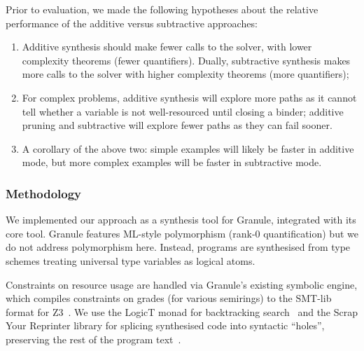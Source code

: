 \newcommand{\stderr}[1]{\textcolor{gray}{${#1}$}} %
\newcommand{\fail}{\textcolor{mypink3}{$\times$}}
\newcommand{\success}{\checkmark}
\newcommand{\highlight}[1]{%
{\setlength{\fboxsep}{0pt}\colorbox{yellow!50}{$\displaystyle#1$}}}

Prior to evaluation, we made the following hypotheses about the
relative performance of the additive versus subtractive approaches:
%
\begin{enumerate}[itemsep=0em]
\item Additive synthesis should make fewer calls to the solver, with lower
complexity theorems (fewer quantifiers). Dually,
subtractive synthesis makes more calls to the solver with
higher complexity theorems (more quantifiers);

\item For complex problems, additive synthesis will
explore more paths as it cannot tell whether a variable is not
well-resourced until closing a binder; additive pruning and subtractive will
explore fewer paths as they can fail sooner.

\item A corollary of the above two: simple examples will
likely be faster in additive mode, but more complex examples will be
faster in subtractive mode.
\end{enumerate}

\subsubsection{Methodology}
We implemented our approach as a synthesis tool for
Granule, integrated with its core tool. Granule features
ML-style polymorphism (rank-0 quantification) but we do not address polymorphism here.
Instead, programs are synthesised from type schemes treating universal
type variables as logical atoms. %

Constraints on resource usage are handled via Granule's existing
symbolic engine, which compiles constraints on grades (for various semirings)
to the SMT-lib format for Z3~\cite{z3}.
We use the LogicT
monad for backtracking search~\cite{logict}
and the Scrap Your Reprinter library for
splicing synthesised code into syntactic ``holes'',
preserving the rest of the program text~\cite{clarke2017scrap}.

